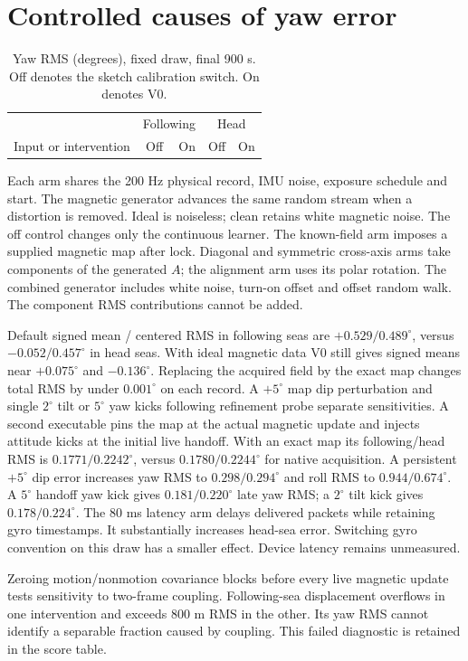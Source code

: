 \documentclass[conference]{IEEEtran}
\begin{document}
\section{Controlled causes of yaw error}
\begin{table}[t]\centering\small
\caption{Yaw RMS (degrees), fixed draw, final 900 s. Off denotes the sketch calibration switch. On denotes V0.}
\begin{tabular}{lrrrr}\toprule
 & \multicolumn{2}{c}{Following} & \multicolumn{2}{c}{Head}\\
Input or intervention & Off & On & Off & On\\\midrule
\end{tabular}\end{table}
Each arm shares the 200 Hz physical record, IMU noise, exposure schedule and start. The magnetic generator advances the same random stream when a distortion is removed. Ideal is noiseless; clean retains white magnetic noise. The off control changes only the continuous learner. The known-field arm imposes a supplied magnetic map after lock. Diagonal and symmetric cross-axis arms take components of the generated $A$; the alignment arm uses its polar rotation. The combined generator includes white noise, turn-on offset and offset random walk. The component RMS contributions cannot be added.

Default signed mean / centered RMS in following seas are $+0.529/0.489^\circ$, versus $-0.052/0.457^\circ$ in head seas. With ideal magnetic data V0 still gives signed means near $+0.075^\circ$ and $-0.136^\circ$. Replacing the acquired field by the exact map changes total RMS by under $0.001^\circ$ on each record. A $+5^\circ$ map dip perturbation and single $2^\circ$ tilt or $5^\circ$ yaw kicks following refinement probe separate sensitivities. A second executable pins the map at the actual magnetic update and injects attitude kicks at the initial live handoff. With an exact map its following/head RMS is $0.1771/0.2242^\circ$, versus $0.1780/0.2244^\circ$ for native acquisition. A persistent $+5^\circ$ dip error increases yaw RMS to $0.298/0.294^\circ$ and roll RMS to $0.944/0.674^\circ$. A $5^\circ$ handoff yaw kick gives $0.181/0.220^\circ$ late yaw RMS; a $2^\circ$ tilt kick gives $0.178/0.224^\circ$. The 80 ms latency arm delays delivered packets while retaining gyro timestamps. It substantially increases head-sea error. Switching gyro convention on this draw has a smaller effect. Device latency remains unmeasured.

Zeroing motion/nonmotion covariance blocks before every live magnetic update tests sensitivity to two-frame coupling. Following-sea displacement overflows in one intervention and exceeds 800 m RMS in the other. Its yaw RMS cannot identify a separable fraction caused by coupling. This failed diagnostic is retained in the score table.
\end{document}
